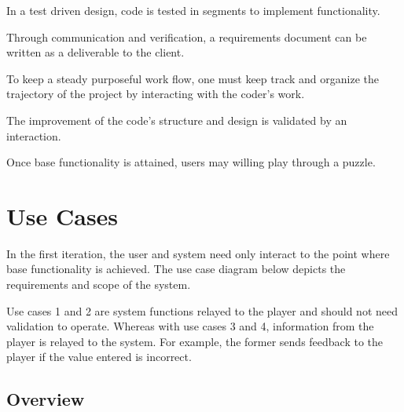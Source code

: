 \documentclass[12pt]{article}
\begin{document}
\begin{description}[font=$\bullet$~\normalfont\scshape\color{red!50!black}] 
\item [Coders] In a test driven design, code is tested in segments to implement functionality.
\item [Documenters] Through communication and verification, a requirements document can be written as a deliverable to the client.
\item [Organizers] To keep a steady purposeful work flow, one must keep track and organize the trajectory of the project by interacting with the coder's work.    
\item [Quality Assurance] The improvement of the code's structure and design is validated by an interaction.
\item [Players] Once base functionality is attained, users may willing play through a puzzle. 
\end{description}

\clearpage

\section{Use Cases}

In the first iteration, the user and system need only interact to the point where base functionality is achieved. The use case diagram below depicts the requirements and scope of the system.

Use cases 1 and 2 are system functions relayed to the player and should not need validation to operate. Whereas with use cases 3 and 4, information from the player is relayed to the system. For example, the former sends feedback to the player if the value entered is incorrect.


\subsection{Overview}
\end{document}

